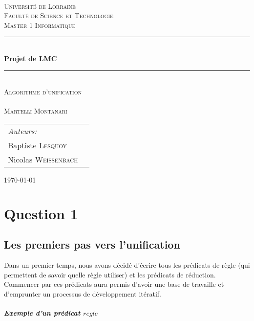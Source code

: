 \documentclass[10pt,a4paper]{report}
\newcommand{\HRule}{\rule{\linewidth}{1mm}}
\begin{document}
  \begin{titlepage}
    \begin{center}
      ~\\[4cm]
      \textsc{\LARGE Université de Lorraine}\\[1.5cm]
      \textsc{\Large Faculté de Science et Technologie}\\[0.5cm]
      \textsc{\Large Master 1 Informatique}\\[0.5cm]
      \HRule \\[0.4cm]
      { \huge \bfseries Projet de LMC \\[0.4cm] }
      \HRule \\[1cm]
     \textsc{\LARGE Algorithme d'unification \\ ~ \\ Martelli Montanari }\\[1cm]
      \begin{tabular*}{\textwidth}{@{}l@{\extracolsep{\fill}}r@{}}
	\emph{Auteurs:}\\
	Baptiste \textsc{Lesquoy} \\
	Nicolas \textsc{Weissenbach}\\
      \end{tabular*}
      \vfill
      {\large \today}
    \end{center}
  \end{titlepage}

\tableofcontents
\chapter*{Question 1}

\section*{Les premiers pas vers l'unification}
Dans un premier temps, nous avons décidé d'écrire tous les prédicats de règle (qui permettent de savoir quelle règle utiliser) et les prédicats de réduction. Commencer par ces prédicats aura permis d'avoir une base de travaille et d'emprunter un processus de développement itératif.

\paragraph{Exemple d'un prédicat $regle$} ~\\
\end{document}
